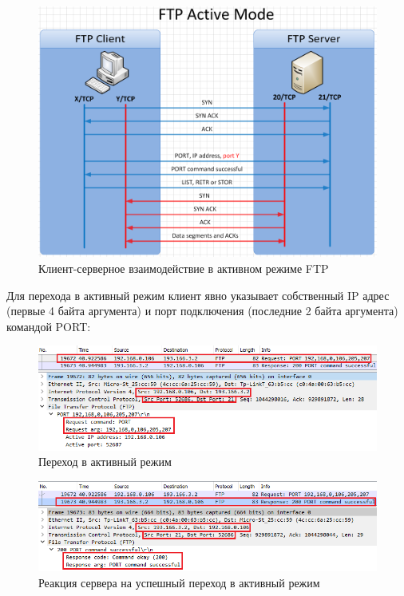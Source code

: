 \documentclass[14pt,a4paper,report]{report}
\begin{document}
\begin{figure}[h!]
	\centering
	\includegraphics[scale = 0.55]{images/scheme_ftp_active.png}
	
	\caption{Клиент-серверное взаимодействие в активном режиме FTP}
	\label{image:2}
\end{figure}

Для перехода в активный режим клиент явно указывает собственный IP адрес (первые 4 байта аргумента) и порт подключения (последние 2 байта аргумента) командой PORT:

\begin{figure}[h!]
	\centering
	\includegraphics[scale = 0.73]{images/ftp6.png}
	
	\caption{Переход в активный режим}
	\label{image:8}
\end{figure}

\begin{figure}[h!]
	\centering
	\includegraphics[scale = 0.73]{images/ftp7.png}
	
	\caption{Реакция сервера на успешный переход в активный режим}
	\label{image:9}
\end{figure}
\end{document}
